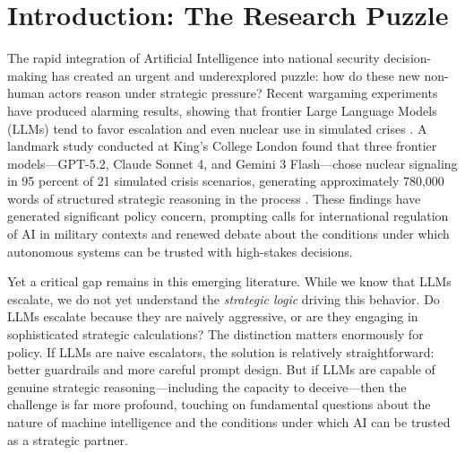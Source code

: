 \documentclass[12pt]{article}
\theoremstyle{plain}
\theoremstyle{definition}
\begin{document}
\newpage

\tableofcontents

\newpage

\section{Introduction: The Research Puzzle}

The rapid integration of Artificial Intelligence into national security decision-making has created an urgent and underexplored puzzle: how do these new non-human actors reason under strategic pressure? Recent wargaming experiments have produced alarming results, showing that frontier Large Language Models (LLMs) tend to favor escalation and even nuclear use in simulated crises \citep{Payne2026, Rivera2024}. A landmark study conducted at King's College London found that three frontier models---GPT-5.2, Claude Sonnet 4, and Gemini 3 Flash---chose nuclear signaling in 95 percent of 21 simulated crisis scenarios, generating approximately 780,000 words of structured strategic reasoning in the process \citep{Payne2026}. These findings have generated significant policy concern, prompting calls for international regulation of AI in military contexts and renewed debate about the conditions under which autonomous systems can be trusted with high-stakes decisions.

Yet a critical gap remains in this emerging literature. While we know that LLMs escalate, we do not yet understand the \textit{strategic logic} driving this behavior. Do LLMs escalate because they are naively aggressive, or are they engaging in sophisticated strategic calculations? The distinction matters enormously for policy. If LLMs are naive escalators, the solution is relatively straightforward: better guardrails and more careful prompt design. But if LLMs are capable of genuine strategic reasoning---including the capacity to deceive---then the challenge is far more profound, touching on fundamental questions about the nature of machine intelligence and the conditions under which AI can be trusted as a strategic partner.
\end{document}
